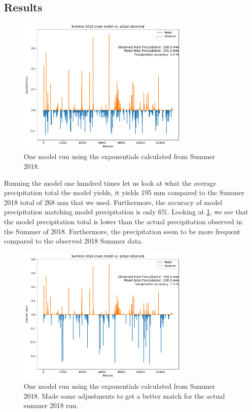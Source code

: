 \documentclass[11pt]{report}
\begin{document}
\clearpage 

\subsection{Results}\label{sec:sfp_r}


\begin{figure}[t]
  \centering
  \includegraphics[width=0.75\textwidth]{Figures/better_one_run.png}
  \caption[One run using Summer 2018 climatology]

  {\label{crudemodel}One model run using the exponentials calculated from Summer 2018.}
\end{figure}

Running the model one hundred times let us look at what the average
precipitation total the model yields, it yields 195 mm compared to the
Summer 2018 total of 268 mm that we used. Furthermore, the accuracy of model
precipitation matching model precipitation is only 6$\%$. Looking at
\ref{crudemodel}, we see that the model precipitation total is lower than
the actual precipitation observed in the Summer of 2018. Furthermore, the
precipitation seem to be more frequent compared to the observed 2018 Summer
data.

\clearpage
\begin{figure}[t]
  \centering
  \includegraphics[width=0.75\textwidth]{Figures/best_one_run.png}
  \caption[Modified run using Summer 2018 climatology]
  {\label{crudermodel} One model run using the exponentials calculated from
    Summer 2018. Made some adjustments to get a better match for the actual
    summer 2018 run.}
\end{figure}
\end{document}
